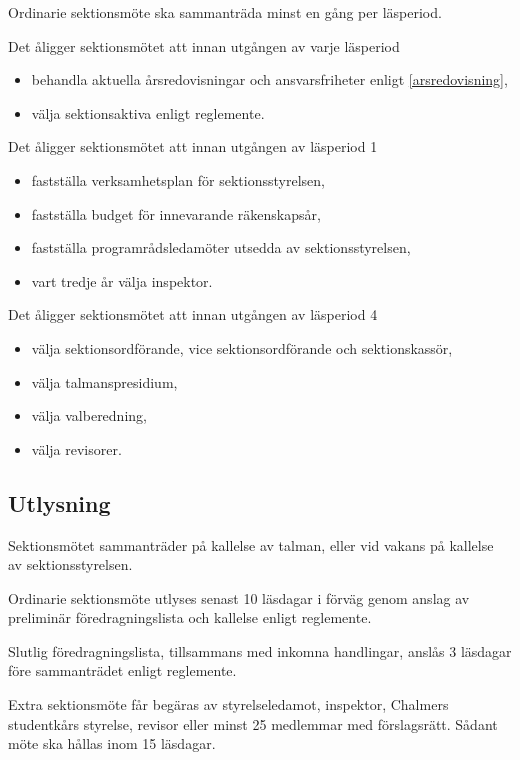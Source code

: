 \documentclass{styrdokument}
\begin{document}
\? Ordinarie sektionsmöte ska sammanträda minst en gång per läsperiod.

\? Det åligger sektionsmötet att innan utgången av varje läsperiod
\begin{itemize}
	\item behandla aktuella årsredovisningar och ansvarsfriheter enligt \cref{arsredovisning},
    \item välja sektionsaktiva enligt reglemente.
\end{itemize}

\? Det åligger sektionsmötet att innan utgången av läsperiod 1
\begin{itemize}
    \item fastställa verksamhetsplan för sektionsstyrelsen,
    \item fastställa budget för innevarande räkenskapsår,
    \item fastställa programrådsledamöter utsedda av sektionsstyrelsen,
    \item vart tredje år välja inspektor.
\end{itemize}

\? Det åligger sektionsmötet att innan utgången av läsperiod 4
\begin{itemize}
    \item välja sektionsordförande, vice sektionsordförande och sektionskassör,
    \item välja talmanspresidium,
    \item välja valberedning,
    \item välja revisorer.
\end{itemize}

\subsection{Utlysning} \label{utlysning}

\? Sektionsmötet sammanträder på kallelse av talman, eller vid vakans på kallelse av sektionsstyrelsen.

\? Ordinarie sektionsmöte utlyses senast 10 läsdagar i förväg genom anslag av preliminär föredragningslista och kallelse enligt reglemente.

\? Slutlig föredragningslista, tillsammans med inkomna handlingar, anslås 3 läsdagar före sammanträdet enligt reglemente.

\? Extra sektionsmöte får begäras av styrelseledamot, inspektor, Chalmers studentkårs styrelse, revisor eller minst 25 medlemmar med förslagsrätt.
Sådant möte ska hållas inom 15 läsdagar.
  
\end{document}
